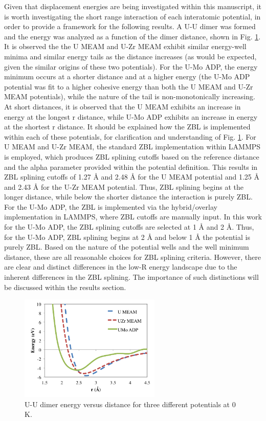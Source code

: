 \documentclass[review]{elsarticle}
\begin{document}
Given that displacement energies are being investigated within this manuscript, it is worth investigating the short range interaction of each interatomic potential, in order to provide a framework for the following results. A U-U dimer was formed and the energy was analyzed as a function of the dimer distance, shown in Fig. \ref{fig:dimer}. It is observed the the U MEAM and U-Zr MEAM exhibit similar energy-well minima and similar energy tails as the distance increases (as would be expected, given the similar origins of these two potentials). For the U-Mo ADP, the energy minimum occurs at a shorter distance and at a higher energy (the U-Mo ADP potential was fit to a higher cohesive energy than both the U MEAM and U-Zr MEAM potentials), while the nature of the tail is non-monotonically increasing. At short distances, it is observed that the U MEAM exhibits an increase in energy at the longest r distance, while U-Mo ADP exhibits an increase in energy at the shortest r distance. It should be explained how the ZBL is implemented within each of these potentials, for clarification and understanding of Fig. \ref{fig:dimer}. For U MEAM and U-Zr MEAM, the standard ZBL implementation within LAMMPS is employed, which produces ZBL splining cutoffs based on the reference distance and the alpha parameter provided within the potential definition. This results in ZBL splining cutoffs of 1.27 {\AA} and 2.48 {\AA} for the U MEAM potential and 1.25 {\AA} and 2.43 {\AA} for the U-Zr MEAM potential. Thus, ZBL splining begins at the longer distance, while below the shorter distance the interaction is purely ZBL. For the U-Mo ADP, the ZBL is implemented via the hybrid/overlay implementation in LAMMPS, where ZBL cutoffs are manually input. In this work for the U-Mo ADP, the ZBL splining cutoffs are selected at 1 {\AA} and 2 {\AA}. Thus, for the U-Mo ADP, ZBL splining begins at 2 {\AA} and below 1 {\AA} the potential is purely ZBL. Based on the nature of the potential wells and the well minimum distance, these are all reasonable choices for ZBL splining criteria. However, there are clear and distinct differences in the low-R energy landscape due to the inherent differences in the ZBL splining. The importance of such distinctions will be discussed within the results section. 



\begin{figure}[h]
 \centering
 \includegraphics[width=0.6\textwidth]{U_U_dimer.png} 
 \caption{U-U dimer energy versus distance for three different potentials at 0 K.}
 \label{fig:dimer}
\end{figure}
\end{document}
